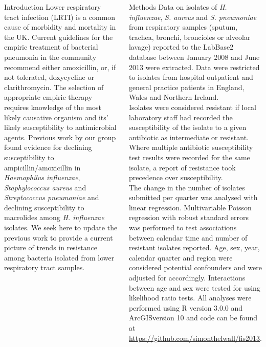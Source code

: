 \documentclass[final, 14pt]{beamer}
\begin{document}
\begin{frame}
\begin{columns}[t]
 \begin{minipage}[t]{.95\textwidth} %
  \begin{block}{Introduction}
  Lower respiratory tract infection (LRTI) is a common cause of morbidity and mortality in the UK. \citep{Davies2012}
   Current guidelines for the empiric treatment of bacterial pneumonia in the community recommend either amoxicillin, or, if not tolerated, doxycycline or clarithromycin. \citep{Lim2009}
   The selection of appropriate empiric therapy requires knowledge of the most likely causative organism and its' likely susceptibility to antimicrobial agents.
   Previous work by our group found evidence for declining susceptibility to ampicillin/amoxicillin in \textit{Haemophilus influenzae}, \textit{Staphylococcus aureus} and \textit{Streptococcus pneumoniae} and declining susceptibility to macrolides among \textit{H. influenzae} isolates. \citep{Blackburn2011}
   We seek here to update the previous work to provide a current picture of trends in resistance among bacteria isolated from lower respiratory tract samples. \\
   \end{block}
  
  \begin{block}{Methods}
Data on isolates of \textit{H. influenzae}, \textit{S. aureus} and \textit{S. pneumoniae} from respiratory samples (sputum, trachea, bronchi, broncioles or alveolar lavage) reported to the LabBase2 database between January 2008 and June 2013 were extracted. 
   Data were restricted to isolates from hospital outpatient and general practice patients in England, Wales and Northern Ireland.\\
   Isolates were considered resistant if local laboratory staff had recorded the susceptibility of the isolate to a given antibiotic as intermediate or resistant. 
   Where multiple antibiotic susceptibility test results were recorded for the same isolate, a report of resistance took precedence over susceptibility. \\
   The change in the number of isolates submitted per quarter was analysed with linear regression. 
   Multivariable Poisson regression with robust standard errors was performed to test associations between calendar time and number of resistant isolates reported.
   Age, sex, year, calendar quarter and region were considered potential confounders and were adjusted for accordingly.
   Interactions between age and sex were tested for using likelihood ratio tests. 
   All analyses were performed using R version 3.0.0 and ArcGIS\texttrademark version 10 and code can be found at \url{https://github.com/simonthelwall/fis2013}.
  \end{block}
  

\end{minipage}
\end{columns}
\end{frame}
\end{document}
